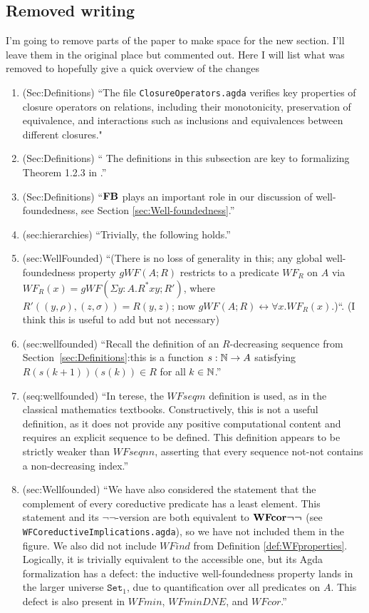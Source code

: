 \documentclass{article}
\begin{document}
\begin{todolist}
\subsection*{Removed writing}
I'm going to remove parts of the paper to make space for the new section. I'll leave them in the original place but commented out. Here I will list what was removed to hopefully give a quick overview of the changes
\begin{enumerate}
    \item (Sec:Definitions) ``The file \texttt{ClosureOperators.agda} verifies key properties of closure operators on relations, including their monotonicity, preservation of equivalence, and interactions such as inclusions and equivalences between different closures."
    \item (Sec:Definitions) `` The definitions in this subsection are key to formalizing Theorem 1.2.3 in \terese.''
    \item (Sec:Definitions) ``$\mathbf{FB}$ plays an important role in our discussion of well-foundedness, see Section \ref{sec:Well-foundedness}.''
    \item (sec:hierarchies) ``Trivially, the following holds.''
    \item (sec:WellFounded) ``(There is no loss of generality in this; any global well-foundedness property $gWF(A;R)$  restricts to a predicate $WF_R$ on $A$ via $WF_R(x) = gWF(\Sigma y {:} A. R^* x y;R')$, where $R'((y,\rho),(z,\sigma)) = R(y,z)$; now $gWF(A;R) \leftrightarrow \forall x. WF_R(x)$.)``. (I think this is useful to add but not necessary) 
    \item (sec:wellfounded) ``Recall the definition of an $R$-decreasing sequence from Section~\ref{sec:Definitions}:this is a function $s : \mathbb{N} \to A$ satisfying $R(s(k+1))(s(k)) \in R$ for all $k \in \mathbb{N}$.''
    \item (seq:wellfounded) ``In terese, the $WFseqm$ definition is used, as in the classical mathematics textbooks. Constructively, this is not a useful definition, as it does not provide any positive computational content and requires an explicit sequence to be defined.  This definition appears to be strictly weaker than $WFseqnn$, asserting that every sequence not-not contains a non-decreasing index.''
    \item (sec:Wellfounded) ``We have also considered the statement that the complement of every coreductive predicate
  has a least element.  This statement and its $\lnot\lnot$-version are both equivalent to $\mathbf{WFcor}\boldsymbol{\lnot\lnot}$
  (see \texttt{WFCoreductiveImplications.agda}), so we have not included them in the figure. We also did not include $WFind$ from Definition \ref{def:WFproperties}. Logically, it is trivially equivalent to the accessible one, but its Agda formalization has a defect: the inductive well-foundedness property lands in the larger universe $\mathtt{Set}_1$, due to  quantification over all predicates on $A$.  This defect is also present in $WFmin$, $WFminDNE$, and $WFcor$.''
 \end{enumerate}


\end{todolist}
\end{document}
